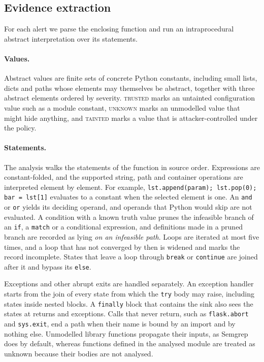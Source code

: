 \subsection{Evidence extraction}
For each alert we parse the enclosing function and run an intraprocedural abstract interpretation over its statements.

\paragraph{Values.}
Abstract values are finite sets of concrete Python constants, including small lists, dicts and paths whose elements may themselves be abstract, together with three abstract elements ordered by severity. \textsc{trusted} marks an untainted configuration value such as a module constant, \textsc{unknown} marks an unmodelled value that might hide anything, and \textsc{tainted} marks a value that is attacker-controlled under the policy.

\paragraph{Statements.}
The analysis walks the statements of the function in source order. Expressions are constant-folded, and the supported string, path and container operations are interpreted element by element. For example, \texttt{lst.append(param); lst.pop(0); bar = lst[1]} evaluates to a constant when the selected element is one. An \texttt{and} or \texttt{or} yields its deciding operand, and operands that Python would skip are not evaluated. A condition with a known truth value prunes the infeasible branch of an \texttt{if}, a \texttt{match} or a conditional expression, and definitions made in a pruned branch are recorded as lying \emph{on an infeasible path}. Loops are iterated at most five times, and a loop that has not converged by then is widened and marks the record incomplete. States that leave a loop through \texttt{break} or \texttt{continue} are joined after it and bypass its \texttt{else}.

Exceptions and other abrupt exits are handled separately. An exception handler starts from the join of every state from which the \texttt{try} body may raise, including states inside nested blocks. A \texttt{finally} block that contains the sink also sees the states at returns and exceptions. Calls that never return, such as \texttt{flask.abort} and \texttt{sys.exit}, end a path when their name is bound by an import and by nothing else. Unmodelled library functions propagate their inputs, as Semgrep does by default, whereas functions defined in the analysed module are treated as unknown because their bodies are not analysed.

